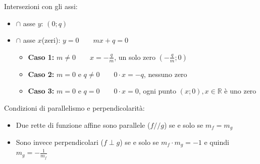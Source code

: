 \documentclass[../main.tex]{subfiles}
\begin{document}
\vspace{1.5cm}
Intersezioni con gli assi:
\begin{itemize}
    \item $\cap$ asse $y$: $(0; q)$
    \item $\cap$ asse $x$(zeri): $y = 0 \phantom{--}mx+q = 0$
    \begin{itemize}
        \item \textbf{Caso 1:} $m \neq 0 \phantom{--}x = -\frac{q}{m}$, un solo zero $(-\frac{q}{m};0)$
        \item \textbf{Caso 2:} $m = 0$ e $q \neq 0 \phantom{--} 0 \cdot x = -q$, nessuno zero
        \item \textbf{Caso 3:} $m = 0$ e $q = 0 \phantom{--} 0 \cdot x = 0$, ogni punto $(x;0), x\in\mathbb{R}$ è uno zero
    \end{itemize}
\end{itemize}

Condizioni di parallelismo e perpendicolarità:
\begin{itemize}
    \item Due rette di funzione affine sono parallele ($f/ / g$) se e solo se $m_f = m_g$
    \item Sono invece perpendicolari ($f\perp g$) se e solo se $m_f \cdot m_g = -1$ e quindi $m_g = -\frac{1}{m_f}$
\end{itemize}

\pagebreak
\end{document}
